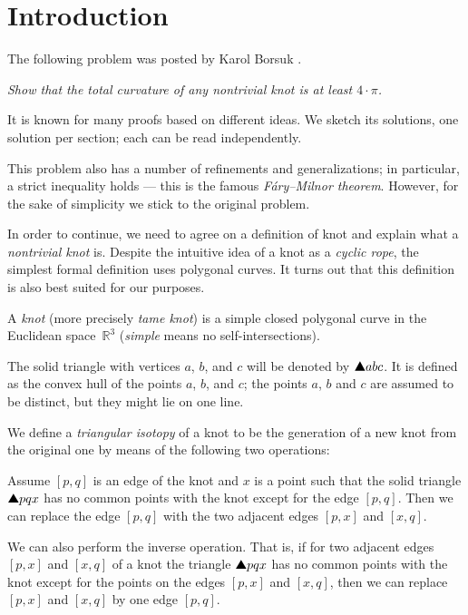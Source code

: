 \section{Introduction}

The following problem was posted by Karol Borsuk \cite{borsuk}.

\smallskip

\textit{Show that the total curvature of any nontrivial knot is at least $4\cdot\pi$.}

\smallskip

It is known for many proofs based on different ideas.
We sketch its solutions, one solution per section;
each can be read independently.

This problem also has a number of refinements and generalizations;
in particular, a strict inequality holds --- this is the famous \emph{F\'ary--Milnor theorem}.
However, for the sake of simplicity we stick to the original problem.

In order to continue, we need to agree on a definition of knot and explain what a \emph{nontrivial knot} is.
Despite the intuitive idea of a knot as a \emph{cyclic rope},
the simplest formal definition uses polygonal curves.
It turns out that this definition is also best suited for our purposes.

A \emph{knot} (more precisely \emph{tame knot}) is a simple closed polygonal curve in the Euclidean space~$\mathbb{R}^3$ (\emph{simple} means no self-intersections).

The solid triangle with vertices $a$, $b$, and $c$ will be denoted by $\solidtriangle abc$.
It is defined as the convex hull of the points $a$, $b$, and $c$;
the points $a$, $b$ and $c$ are assumed to be distinct, but they might lie on one line.

We define a \emph{triangular isotopy} of a knot to be the generation of a new knot from the original one by means of the
following two operations:

Assume $[p,q]$ is an edge of the knot and $x$
is a point such that the solid triangle $\solidtriangle pqx$  has no common points with the knot except for the edge $[p,q]$.
Then we can replace the edge $[p,q]$ with the two adjacent edges $[p,x]$ and $[x,q]$.

We can also perform the inverse operation.
That is, if for two adjacent edges $[p,x]$ and $[x,q]$ of a knot the triangle
$\solidtriangle pqx$ has no common points with the knot except for the points on the edges $[p,x]$ and $[x,q]$,
then we can replace $[p,x]$ and $[x,q]$ by one edge $[p,q]$.

